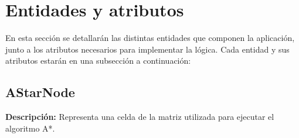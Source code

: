 





\section{Entidades y atributos}

En esta sección se detallarán las distintas entidades que componen la aplicación, junto a los atributos necesarios para implementar la lógica. Cada entidad y sus atributos estarán en una subsección a continuación:

\subsection{AStarNode}
\textbf{Descripción: }Representa una celda de la matriz utilizada para ejecutar el algoritmo A*.

